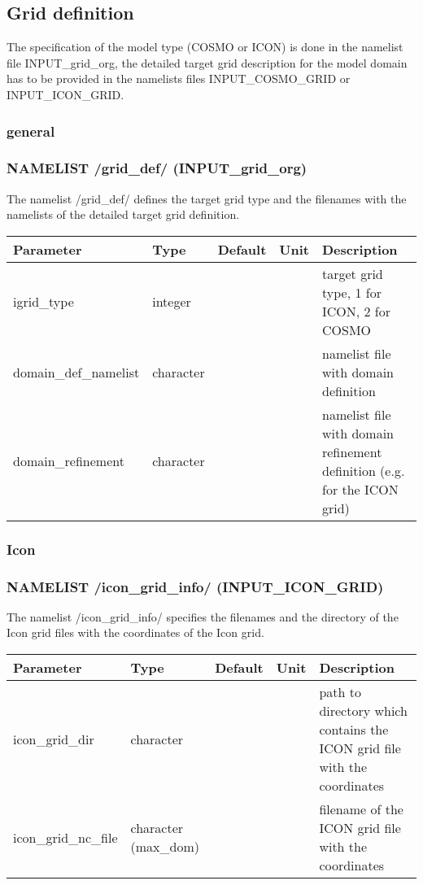 \documentclass[a4paper,10pt,DIV14,BCOR1cm,titlepage,twoside]{scrartcl}
\providecommand{\tabularnewline}{\\}
\begin{document}
\subsection{Grid definition}\label{namelist_input_for_extpar_grid_def}
The specification of the model type (COSMO or ICON) is done in the namelist file INPUT\_grid\_org, the detailed target grid description for the model domain has to be provided in the namelists files INPUT\_COSMO\_GRID or INPUT\_ICON\_GRID.
\label{namelist_target}
\subsubsection{general}\label{namelist_input_for_extpar_grid_def_general}
\subsubsection*{NAMELIST /grid\_def/ (INPUT\_grid\_org)}
The namelist  /grid\_def/ defines the target grid type and the filenames with the namelists of the detailed target grid definition.

\begin{longtable}{|p{4.2cm}|p{1.5cm}|p{1.5cm}|p{0.8cm}|p{6cm}|}
\hline 
\textbf{Parameter}&\textbf{Type}&\textbf{Default}&\textbf{Unit}&\textbf{Description}\tabularnewline
\hline
\endhead
\hline 
igrid\_type& integer& & & target grid type, 1 for ICON, 2 for COSMO 
\tabularnewline
\hline 
domain\_def\_namelist & character& & & namelist file with domain definition 
\tabularnewline
\hline
domain\_refinement & character& & & namelist file with domain refinement definition (e.g. for the ICON grid)
 \tabularnewline
\hline
\end{longtable}

\subsubsection{Icon}\label{namelist_input_for_extpar_grid_def_icon}

\subsubsection*{NAMELIST /icon\_grid\_info/ (INPUT\_ICON\_GRID) }
The namelist /icon\_grid\_info/ specifies the filenames and the directory of the Icon grid files with the coordinates of the Icon grid.

\begin{longtable}{|p{4cm}|p{1.5cm}|p{1.5cm}|p{1cm}|p{6cm}|}
\hline 
\textbf{Parameter}& \textbf{Type}& \textbf{Default}& \textbf{Unit}& \textbf{Description}
\tabularnewline
\hline
\endhead
\hline 
icon\_grid\_dir & character & &  & path to directory which contains the ICON grid file with the coordinates \tabularnewline
\hline 
icon\_grid\_nc\_file & character (max\_dom) & & & filename of the ICON grid file with the coordinates\tabularnewline
\hline 
\bottomrule
\end{longtable}
\end{document}
